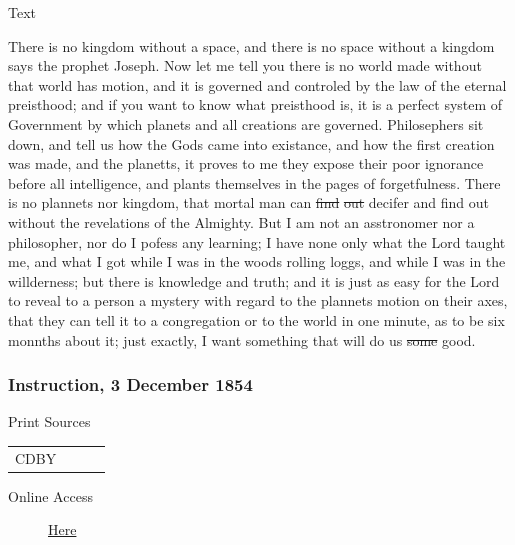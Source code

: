 				\begin{description}
					\item[Text]
				\end{description}
				
					There is no kingdom without a space, and there is no space without a kingdom says the prophet Joseph. Now let me tell you there is no world made without that world has motion, and it is governed and controled by the law of the eternal preisthood; and if you want to know what preisthood is, it is a perfect system of Government by which planets and all creations are governed. Philosephers sit down, and tell us how the Gods came into existance, and how the first creation was made, and the planetts, it proves to me they expose their poor ignorance before all intelligence, and plants themselves in the pages of forgetfulness. There is no plannets nor kingdom, that mortal man can \sout{find} \sout{out} decifer and find out without the revelations of the Almighty. But I am not an asstronomer nor a philosopher, nor do I pofess any learning; I have none only what the Lord taught me, and what I got while I was in the woods rolling loggs, and while I was in the willderness; but there is knowledge and truth; and it is just as easy for the Lord to reveal to a person a mystery with regard to the plannets motion on their axes, that they can tell it to a congregation or to the world in one minute, as to be six monnths about it; just exactly, I want something that will do us \sout{some} good.
					
		\subsubsection{Instruction, 3 December 1854}
			\label{EMS-1854-BY-3-DEC-1854}
			
			\begin{description}
					\item[Print Sources]
				\end{description}

					\begin{tabular}{p{0.5in}p{1in}p{0.5in}p{1in}}
					CDBY	& 		&  		&  \\
					\end{tabular}
				
				\begin{description}
					\item[Online Access] \href{https://jod.mrm.org/2/136}{Here}
				\end{description}
				
